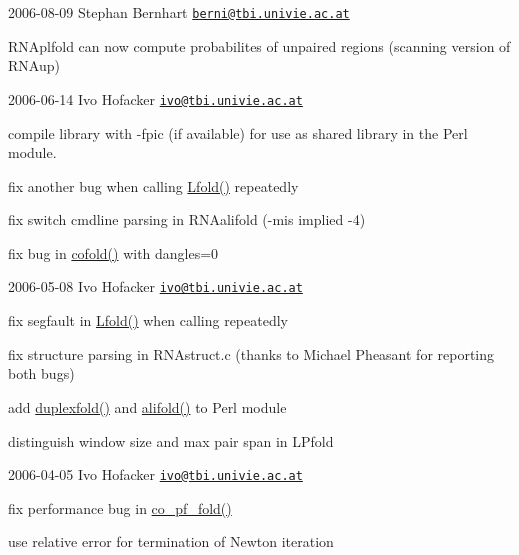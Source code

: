2006-\/08-\/09 Stephan Bernhart \href{mailto:berni@tbi.univie.ac.at}{\tt berni@tbi.\+univie.\+ac.\+at}


\begin{DoxyItemize}
\item R\+N\+Aplfold can now compute probabilites of unpaired regions (scanning version of R\+N\+Aup)
\end{DoxyItemize}

2006-\/06-\/14 Ivo Hofacker \href{mailto:ivo@tbi.univie.ac.at}{\tt ivo@tbi.\+univie.\+ac.\+at}


\begin{DoxyItemize}
\item compile library with -\/fpic (if available) for use as shared library in the Perl module.
\item fix another bug when calling \mbox{\hyperlink{group__local__mfe__fold_ga16e5a70e60835bb969eaecbe6482f1be}{Lfold()}} repeatedly
\item fix switch cmdline parsing in R\+N\+Aalifold (-\/mis implied -\/4)
\item fix bug in \mbox{\hyperlink{group__mfe__cofold_gabc8517f22cfe70595ee81fc837910d52}{cofold()}} with dangles=0
\end{DoxyItemize}

2006-\/05-\/08 Ivo Hofacker \href{mailto:ivo@tbi.univie.ac.at}{\tt ivo@tbi.\+univie.\+ac.\+at}


\begin{DoxyItemize}
\item fix segfault in \mbox{\hyperlink{group__local__mfe__fold_ga16e5a70e60835bb969eaecbe6482f1be}{Lfold()}} when calling repeatedly
\item fix structure parsing in R\+N\+Astruct.\+c (thanks to Michael Pheasant for reporting both bugs)
\item add \mbox{\hyperlink{duplex_8h_a5cd7d482c454fb04d4e5339c0e57d9f2}{duplexfold()}} and \mbox{\hyperlink{group__consensus__mfe__fold_ga4cf00f0659e5f0480335d69e797f05b1}{alifold()}} to Perl module
\item distinguish window size and max pair span in L\+Pfold
\end{DoxyItemize}

2006-\/04-\/05 Ivo Hofacker \href{mailto:ivo@tbi.univie.ac.at}{\tt ivo@tbi.\+univie.\+ac.\+at}


\begin{DoxyItemize}
\item fix performance bug in \mbox{\hyperlink{part__func__co_8h_ae5c1e7331718669bdae7a86de2be6184}{co\+\_\+pf\+\_\+fold()}}
\item use relative error for termination of Newton iteration
\end{DoxyItemize}

